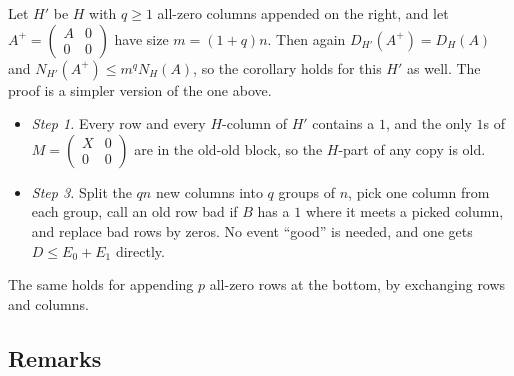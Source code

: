 \documentclass{article}
\theoremstyle{plain}
\theoremstyle{definition}
\begin{document}
Let $H'$ be $H$ with $q \ge 1$ all-zero columns appended on the right, and let
$A^+ = \begin{pmatrix} A & 0 \\ 0 & 0 \end{pmatrix}$ have size $m = (1+q)n$. Then again
$D_{H'}(A^+) = D_H(A)$ and $N_{H'}(A^+) \le m^{q} N_H(A)$, so the corollary holds for this
$H'$ as well. The proof is a simpler version of the one above.
\begin{itemize}
\item \emph{Step 1.} Every row and every $H$-column of $H'$ contains a $1$, and the only $1$s
of $M = \begin{pmatrix} X & 0 \\ 0 & 0 \end{pmatrix}$ are in the old-old block, so the $H$-part
of any copy is old.
\item \emph{Step 3.} Split the $qn$ new columns into $q$ groups of $n$, pick one column from
each group, call an old row bad if $B$ has a $1$ where it meets a picked column, and replace
bad rows by zeros. No event ``good'' is needed, and one gets $D \le E_0 + E_1$ directly.
\end{itemize}
The same holds for appending $p$ all-zero rows at the bottom, by exchanging rows and columns.

\subsection*{Remarks}
\end{document}
